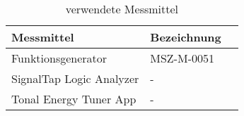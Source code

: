 \begin{table}[H]
	\centering
	\caption{verwendete Messmittel}
	\label{tab:Glissando_Messmittel}
	\begin{tabular}{l|l|l}
		\textbf{Messmittel} & \textbf{Bezeichnung} \\
		\hline\hline
		Funktionsgenerator & MSZ-M-0051   \\ \hline
		SignalTap Logic Analyzer & -    \\ \hline
		Tonal Energy Tuner App &  -   \\ \hline
		
	\end{tabular}
\end{table}

